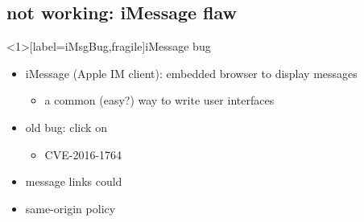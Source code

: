 
\subsection{not working: iMessage flaw}

\begin{frame}<1>[label=iMsgBug,fragile]{iMessage bug}
    \begin{itemize}
        \item iMessage (Apple IM client): embedded browser to display messages
            \begin{itemize}
            \item a common (easy?) way to write user interfaces
            \end{itemize}
        \item old bug: click on 
            \begin{itemize}
            \item CVE-2016-1764 
            \end{itemize}
        \vspace{.5cm}
        \item<2-> message links could 
        \item<2-> same-origin policy 
    \end{itemize}

\end{frame}


